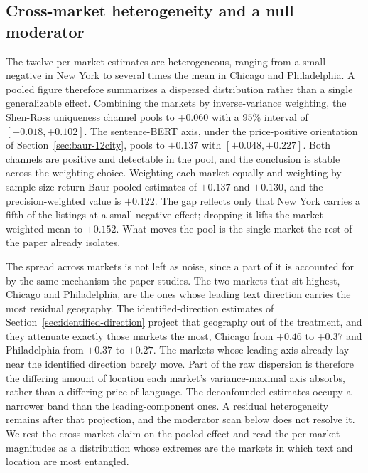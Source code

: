 
\subsection{Cross-market heterogeneity and a null moderator}
\label{sec:meta-regression-12}

The twelve per-market estimates are heterogeneous, ranging from a small negative in New York to several times the mean in Chicago and Philadelphia. A pooled figure therefore summarizes a dispersed distribution rather than a single generalizable effect.
Combining the markets by inverse-variance weighting, the Shen-Ross uniqueness channel pools to $+0.060$ with a $95\%$ interval of $[+0.018, +0.102]$. The sentence-BERT axis, under the price-positive orientation of Section~\ref{sec:baur-12city}, pools to $+0.137$ with $[+0.048, +0.227]$. Both channels are positive and detectable in the pool, and the conclusion is stable across the weighting choice. Weighting each market equally and weighting by sample size return Baur pooled estimates of $+0.137$ and $+0.130$, and the precision-weighted value is $+0.122$. The gap reflects only that New York carries a fifth of the listings at a small negative effect; dropping it lifts the market-weighted mean to $+0.152$. What moves the pool is the single market the rest of the paper already
isolates.

The spread across markets is not left as noise, since a part of it is accounted for
by the same mechanism the paper studies. The two markets that sit highest, Chicago and Philadelphia, are the ones whose leading text direction carries the most residual geography. The identified-direction estimates of Section~\ref{sec:identified-direction} project that geography out of the treatment, and they attenuate exactly those markets the most, Chicago from $+0.46$ to $+0.37$ and Philadelphia from $+0.37$ to $+0.27$. The markets whose leading axis already lay near the identified direction barely move. Part of the raw dispersion is therefore the differing amount of location each market's variance-maximal axis absorbs, rather than a differing price of language. The deconfounded estimates occupy a narrower band than the leading-component ones. A residual heterogeneity remains after that projection, and the moderator scan below does not resolve it. We rest the cross-market claim on the pooled effect and read the per-market magnitudes as a
distribution whose extremes are the markets in which text and location are most
entangled.

